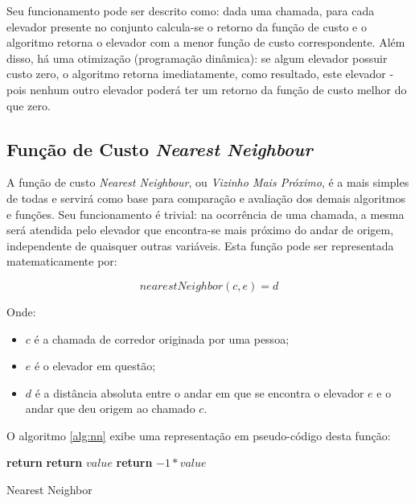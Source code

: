 Seu funcionamento pode ser descrito como: dada uma chamada, para cada elevador
presente no conjunto calcula-se o retorno da função de custo e o algoritmo
retorna o elevador com a menor função de custo correspondente. Além disso, há
uma otimização (programação dinâmica): se algum elevador possuir custo zero, o
algoritmo retorna imediatamente, como resultado, este elevador - pois nenhum
outro elevador poderá ter um retorno da função de custo melhor do que zero.

\subsection{\label{sec:ai:nn}Função de Custo \textit{Nearest Neighbour}}

A função de custo \textit{Nearest Neighbour}, ou \textit{Vizinho Mais Próximo},
é a mais simples de todas e servirá como base para comparação e avaliação dos
demais algoritmos e funções. Seu funcionamento é trivial: na ocorrência de uma
chamada, a mesma será atendida pelo elevador que encontra-se mais próximo do
andar de origem, independente de quaisquer outras variáveis. Esta função pode
ser representada matematicamente por:

\[nearestNeighbor(c, e) = d\]

Onde:
\begin{itemize}
\item \textbf{$c$} é a chamada de corredor originada por uma pessoa;
\item \textbf{$e$} é o elevador em questão;
\item \textbf{$d$} é a distância absoluta entre o andar em que se
encontra o elevador $e$ e o andar que deu origem ao chamado $c$.
\end{itemize}

O algoritmo \ref{alg:nn} exibe uma representação em pseudo-código desta função:

\begin{algorithm}[htb]
\begin{center}
\begin{algorithmic}[1]
  \State \textbf{return} 
\EndFunction
\Statex
{}
    \State \textbf{return} $value$
  \EndIf
  \State \textbf{return} $-1 * value$
\EndFunction
\end{algorithmic}
\end{center}
\caption
   {\label{alg:nn}Nearest Neighbor}
\end{algorithm}

